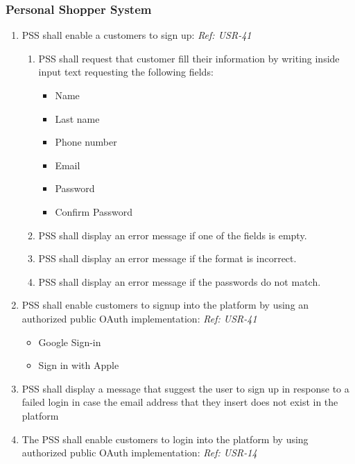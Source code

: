\subsubsection{Personal Shopper System}
\begin{enumerate}[resume, label=SY-\arabic*]
    \item PSS shall enable a customers to sign up:
    \newline \textit{Ref: USR-41}
    \begin{enumerate}[label=SY-5.\arabic*]
        \item PSS shall request that customer fill their information by
        writing inside input text requesting the following fields:
        \begin{itemize}
            \item Name
            \item Last name
            \item Phone number
            \item Email
            \item Password
            \item Confirm Password
        \end{itemize}
        \item PSS shall display an error message if one of the fields is empty.
        \item PSS shall display an error message if the format is incorrect.
        \item PSS shall display an error message if the passwords do not match.
    \end{enumerate}
    \item PSS shall enable customers to signup into the platform by using an 
    authorized public OAuth implementation:
    \newline \textit{Ref: USR-41}
    \begin{itemize}
        \item Google Sign-in \cite{google-sign-in}
        \item Sign in with Apple \cite{sign-in-with-apple}
    \end{itemize}
    \item PSS shall display a message that suggest the user to sign up in
    response to a failed login in case the email address that they 
    insert does not exist in the platform
    \item The PSS shall enable customers to login into the platform by using 
    authorized public OAuth implementation:
    \newline \textit{Ref: USR-14}

\end{enumerate}
